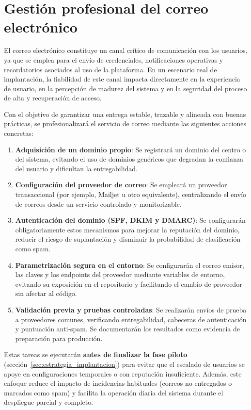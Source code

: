 \section{Gestión profesional del correo electrónico}
\label{sec:correo_profesional}

El correo electrónico constituye un canal crítico de comunicación con los usuarios, ya que se emplea para el envío de credenciales, notificaciones operativas y recordatorios asociados al uso de la plataforma. En un escenario real de implantación, la fiabilidad de este canal impacta directamente en la experiencia de usuario, en la percepción de madurez del sistema y en la seguridad del proceso de alta y recuperación de acceso.

Con el objetivo de garantizar una entrega estable, trazable y alineada con buenas prácticas, se profesionalizará el servicio de correo mediante las siguientes acciones concretas:

\begin{enumerate}
    \item \textbf{Adquisición de un dominio propio}: Se registrará un dominio del centro o del sistema, evitando el uso de dominios genéricos que degradan la confianza del usuario y dificultan la entregabilidad.
    \item \textbf{Configuración del proveedor de correo}: Se empleará un proveedor transaccional (por ejemplo, Mailjet \cite{mailjet_docs} u otro equivalente), centralizando el envío de correos desde un servicio controlado y monitorizable.
    \item \textbf{Autenticación del dominio (SPF, DKIM y DMARC)}: Se configurarán obligatoriamente estos mecanismos para mejorar la reputación del dominio, reducir el riesgo de suplantación y disminuir la probabilidad de clasificación como spam.
    \item \textbf{Parametrización segura en el entorno}: Se configurarán el correo emisor, las claves y los endpoints del proveedor mediante variables de entorno, evitando su exposición en el repositorio y facilitando el cambio de proveedor sin afectar al código.
    \item \textbf{Validación previa y pruebas controladas}: Se realizarán envíos de prueba a proveedores comunes, verificando entregabilidad, cabeceras de autenticación y puntuación anti-spam. Se documentarán los resultados como evidencia de preparación para producción.
\end{enumerate}

Estas tareas se ejecutarán \textbf{antes de finalizar la fase piloto} (sección~\ref{sec:estrategia_implantacion}) para evitar que el escalado de usuarios se apoye en configuraciones temporales o con reputación insuficiente. Además, este enfoque reduce el impacto de incidencias habituales (correos no entregados o marcados como spam) y facilita la operación diaria del sistema durante el despliegue parcial y completo.


